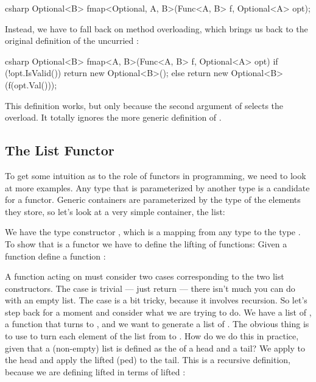 \begin{snip}{csharp}
Optional<B> fmap<Optional, A, B>(Func<A, B> f, Optional<A> opt);
\end{snip}
Instead, we have to fall back on method overloading, which brings us
back to the original definition of the uncurried :

\begin{snip}{csharp}
Optional<B> fmap<A, B>(Func<A, B> f, Optional<A> opt) {
    if (!opt.IsValid())
        return new Optional<B>();
    else
        return new Optional<B>(f(opt.Val()));
}
\end{snip}
This definition works, but only because the second argument of
 selects the overload. It totally ignores the more generic
definition of .

\subsection{The List Functor}

To get some intuition as to the role of functors in programming, we need
to look at more examples. Any type that is parameterized by another type
is a candidate for a functor. Generic containers are parameterized by
the type of the elements they store, so let's look at a very simple
container, the list:

We have the type constructor , which is a mapping from any
type  to the type . To show that 
is a functor we have to define the lifting of functions: Given a
function  define a function
:

A function acting on  must consider two cases
corresponding to the two list constructors. The  case is
trivial --- just return  --- there isn't much you can do
with an empty list. The  case is a bit tricky, because it
involves recursion. So let's step back for a moment and consider what we
are trying to do. We have a list of , a function 
that turns  to , and we want to generate a list of
. The obvious thing is to use  to turn each element
of the list from  to . How do we do this in
practice, given that a (non-empty) list is defined as the 
of a head and a tail? We apply  to the head and apply the
lifted (ped)  to the tail. This is a recursive
definition, because we are defining lifted  in terms of lifted
:

